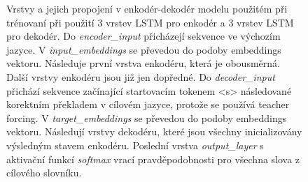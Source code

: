 \begin{figure}[H]
    \begin{center}
    \end{center}
	\caption{Vrstvy a jejich propojení v enkodér-dekodér modelu použitém při trénovaní při použití 3 vrstev LSTM pro enkodér a 3 vrstev LSTM pro dekodér. Do \emph{encoder\_input} přicházejí sekvence ve výchozím jazyce. V \emph{input\_embeddings} se převedou do podoby embeddings vektoru. Následuje první vrstva enkodéru, která je obousměrná. Další vrstvy enkodéru jsou již jen dopředné. Do \emph{decoder\_input} přichází sekvence začínající startovacím tokenem <s> následované korektním překladem v cílovém jazyce, protože se používá teacher forcing. V \emph{target\_embeddings} se převedou do podoby embeddings vektoru. Následují vrstvy dekodéru, které jsou všechny inicializovány výsledným stavem enkodéru. Poslední vrstva \emph{output\_layer} s aktivační funkcí \emph{softmax} vrací pravděpodobnosti pro všechna slova z cílového slovníku.}
	\label{img:model}
\end{figure}

